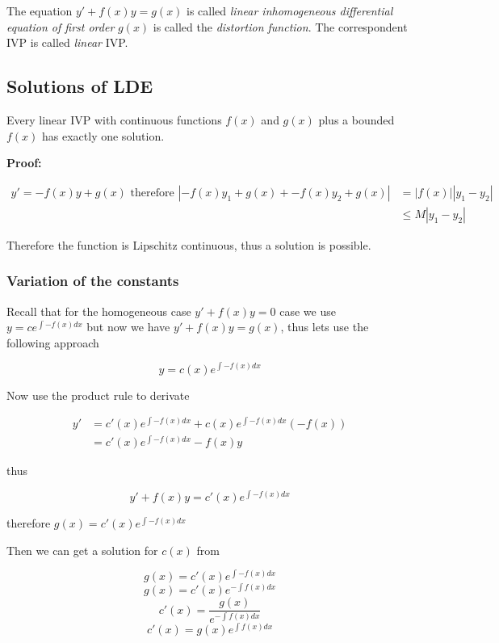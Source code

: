 The equation \(y' + f(x)y = g(x)\) is called \emph{linear inhomogeneous differential equation of first order}
 \(g(x)\) is called the \emph{distortion function}. The correspondent IVP is called
\emph{linear} IVP\@.

\subsection{Solutions of LDE}

Every linear IVP with continuous functions \(f(x)\) and \(g(x)\) plus a bounded \(f(x)\) 
has exactly one solution.
\vspace{\baselineskip}

\textbf{Proof:}

\begin{align*}
y' = -f(x)y + g(x) \text{ therefore } |-f(x)y_1 + g(x) + -f(x)y_2 + g(x) | &= |f(x)||y_1 - y_2|\\
                                                                        &\le M |y_1 - y_2|
\end{align*}

Therefore the function is Lipschitz continuous, thus a solution is possible.
\QED


\subsubsection{Variation of the constants}

Recall that for the homogeneous case \(y' + f(x)y = 0\) case we use 
\(y = c e^{\int -f(x) dx}\) but now we have \(y' + f(x)y = g(x)\), thus lets use the following
approach

\[y = c(x) e^{\int -f(x) dx}\]

Now use the product rule to derivate

\begin{align*}
y' &= c'(x) e^{\int -f(x) dx} + c(x)e^{\int -f(x) dx}(-f(x))\\
   &= c'(x)e^{\int -f(x) dx} - f(x)y
\end{align*}

thus 

\[y' + f(x)y = c'(x)e^{\int -f(x) dx}\]

therefore \(g(x) = c'(x)e^{\int -f(x) dx}\)
\vspace{\baselineskip}

Then we can get a solution for \(c(x)\) from

\[
g(x) = c'(x)e^{\int -f(x) dx}
\]
\[
g(x) = c'(x)e^{-\int f(x) dx}
\]
\[
c'(x) = \frac{g(x)}{e^{-\int f(x) dx}}
\]
\[
    c'(x) = g(x)e^{\int f(x) dx}
\]

